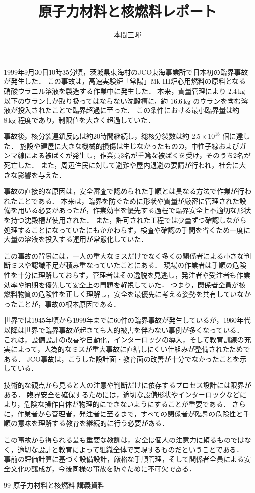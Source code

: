 \documentclass[titlepage,a4paper]{jsarticle}
\title{原子力材料と核燃料レポート}
\author{本間三暉}
\begin{document}
\maketitle
1999年9月30日10時35分頃，茨城県東海村のJCO東海事業所で日本初の臨界事故が発生した．
この事故は，高速実験炉「常陽」Mk-III炉心用燃料の原料となる硝酸ウラニル溶液を製造する作業中に発生した．
本来，質量管理により \(2.4\,\mathrm{kg}\) 以下のウランしか取り扱ってはならない沈殿槽に，約 \(16.6\,\mathrm{kg}\) のウランを含む溶液が投入されたことで臨界超過に至った．
この条件における最小臨界量は約 \(8\,\mathrm{kg}\) 程度であり，制限値を大きく超過していた．

事故後，核分裂連鎖反応は約20時間継続し，総核分裂数は約 \(2.5 \times 10^{18}\) 個に達した．
施設や建屋に大きな機械的損傷は生じなかったものの，中性子線およびガンマ線による被ばくが発生し，作業員3名が重篤な被ばくを受け，そのうち2名が死亡した．
また，周辺住民に対して避難や屋内退避の要請が行われ，社会に大きな影響を与えた．

事故の直接的な原因は，安全審査で認められた手順とは異なる方法で作業が行われたことである．
本来は，臨界を防ぐために形状や質量が厳密に管理された設備を用いる必要があったが，作業効率を優先する過程で臨界安全上不適切な形状を持つ沈殿槽が使用された．
また，許可された工程では少量ずつ確認しながら処理することになっていたにもかかわらず，検査や確認の手間を省くため一度に大量の溶液を投入する運用が常態化していた．

この事故の背景には，一人の重大なミスだけでなく多くの関係者による小さな判断ミスや認識不足が積み重なっていたことにある．
現場の作業者は手順の危険性を十分に理解しておらず，管理者はその逸脱を見逃し，発注者や受注者も作業効率や納期を優先して安全上の問題を軽視していた．
つまり，関係者全員が核燃料物質の危険性を正しく理解し，安全を最優先に考える姿勢を共有していなかったことが，事故の根本原因である．

世界では1945年頃から1999年までに60件の臨界事故が発生しているが，1960年代以降は世界で臨界事故が起きても人的被害を伴わない事例が多くなっている．
これは，設備設計の改善や自動化，インターロックの導入，そして教育訓練の充実によって，人為的なミスが重大事故に直結しにくい仕組みが整備されたためである．
JCO事故は，こうした設計面・教育面の改善が十分でなかったことを示している．

技術的な観点から見ると人の注意や判断だけに依存するプロセス設計には限界がある．
臨界安全を確保するためには，適切な設備形状やインターロックなどにより，危険な操作自体が物理的にできないようにすることが重要である．
さらに，作業者から管理者，発注者に至るまで，すべての関係者が臨界の危険性と手順の意味を理解する教育を継続的に行う必要がある．

この事故から得られる最も重要な教訓は，安全は個人の注意力に頼るものではなく，適切な設計と教育によって組織全体で実現するものだということである．
事前の評価計算に基づく設備設計，厳格な手順管理，そして関係者全員による安全文化の醸成が，今後同様の事故を防ぐために不可欠である．
\begin{thebibliography}{99}
原子力材料と核燃料 講義資料
\end{thebibliography}
\end{document}
